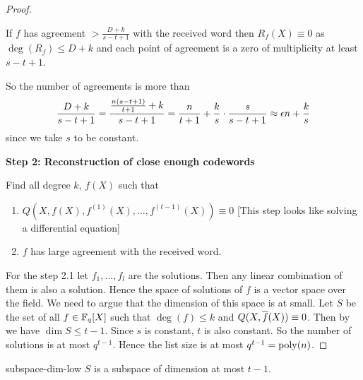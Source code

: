 \begin{proof}
\begin{observation}
    If $f$ has agreement $>\frac{D+k}{s-t+1}$ with the received word then $R_f(X)\equiv 0$ as $\deg(R_f)\leq D+k$ and each point of agreement is a zero of multiplicity at least $s-t+1$.
\end{observation}
So the number of agreements is more than  $$\frac{D+k}{s-t+1}=\frac{\frac{n(s-t+1)}{t+1}+k}{s-t+1}=\frac{n}{t+1}+\frac{k}{s}\cdot \frac{s}{s-t+1}\approx \epsilon n+\frac{k}{s}$$ since we take $s$ to be constant. \parinf\vspace*{5mm}

\textbf{Step 2: Reconstruction of close enough codewords}\parinn

Find all degree $k$, $f(X)$ such that \begin{enumerate}[label=Step 2.\arabic*:, leftmargin=*]
    \item $Q(X,f(X), f^{(1)}(X),\dots, f^{(t-1)}(X))\equiv 0$ [This step looks like solving a differential equation]
    \item $f$ has large agreement with the received word.
\end{enumerate}
For the step 2.1 let $f_1,\dots, f_l$ are the solutions. Then any linear combination of them is also a solution. Hence the space of solutions of $f$ is a vector space over  the field. We need to argue that the dimension of this space is at small. Let $S$ be the set of all $f\in \mathbb{F}_q[X]$ such that $\deg(f)\leq k$ and $Q(X,\overline{f}(X))\equiv 0$. Then by  we have $\dim S\leq t-1$. Since $s$ is constant, $t$ is also constant. So the number of solutions is at most $q^{t-1}$. Hence the list size is at most $q^{t-1}=\operatorname{poly}(n)$. 
\end{proof}
\begin{lemma}{}{subspace-dim-low}
$S$ is a subspace of dimension at most $t-1$. 
\end{lemma}
